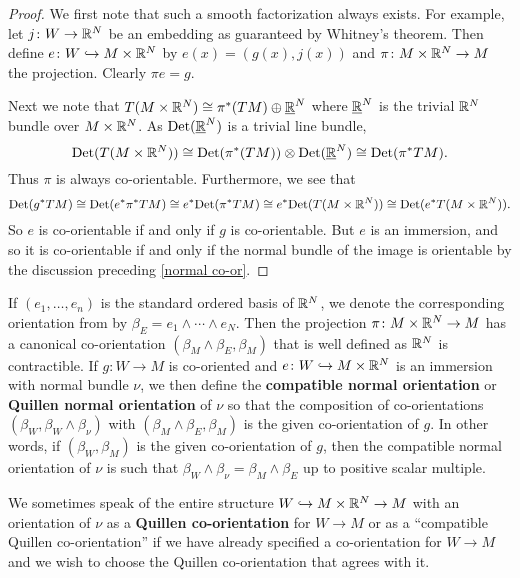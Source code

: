 \begin{proof}
	We first note that such a smooth factorization always exists.
	For example, let $j \colon W \to \mathbb{R}^N$ be an embedding as guaranteed by Whitney's theorem.
	Then define $e \colon W \hookrightarrow M \times \mathbb{R}^N$ by $e(x) = (g(x),j(x))$ and $\pi \colon M \times \mathbb{R}^N \to M$ the projection.
	Clearly $\pi e = g$.

	Next we note that $T(M \times \mathbb{R}^N) \cong \pi^*(TM) \oplus \underline{\mathbb{R}}^N$ where $\underline{\mathbb{R}}^N$ is the trivial $\mathbb{R}^N$ bundle over $M \times \mathbb{R}^N$.
	As ${\rm Det}( \underline{\mathbb{R}}^N)$ is a trivial line bundle,
	\begin{equation*}
		{\rm Det}(T(M \times \mathbb{R}^N)) \cong {\rm Det}(\pi^*(TM)) \otimes {\rm Det}(\underline{\mathbb{R}}^N) \cong {\rm Det}(\pi^*TM).
	\end{equation*}
	Thus $\pi$ is always co-orientable.
	Furthermore, we see that
	\begin{equation*}
		{\rm Det}(g^*TM) \cong {\rm Det}(e^*\pi^*TM) \cong e^*{\rm Det}(\pi^*TM) \cong e^*{\rm Det}(T(M \times \mathbb{R}^N)) \cong {\rm Det}(e^*T(M \times \mathbb{R}^N)).
	\end{equation*}
	So $e$ is co-orientable if and only if $g$ is co-orientable.
	But $e$ is an immersion, and so it is co-orientable if and only if the normal bundle of the image is orientable by the discussion preceding \cref{normal co-or}.
\end{proof}

\begin{definition}\label{D: Quillen normal or}
	If $(e_1, \ldots, e_n)$ is the standard ordered basis of $\mathbb{R}^N$, we denote the corresponding orientation from by $\beta_E = e_1 \wedge \cdots \wedge e_N$. 
	Then the projection $\pi \colon M \times \mathbb{R}^N \to M$ has a canonical co-orientation $(\beta_M \wedge \beta_E, \beta_M)$ that is well defined as $\mathbb{R}^N$ is contractible.
	If $g \colon W \to M$ is co-oriented and $e \colon W \hookrightarrow M \times \mathbb{R}^N$ is an immersion with normal bundle $\nu$, we then define the \textbf{compatible normal orientation} or \textbf{Quillen normal orientation} of $\nu$ so that the composition of co-orientations $(\beta_W,\beta_W \wedge \beta_\nu)$ with $(\beta_M \wedge \beta_E,\beta_M)$ is the given co-orientation of $g$.
	In other words, if $(\beta_W,\beta_M)$ is the given co-orientation of $g$, then the compatible normal orientation of $\nu$ is such that $\beta_W \wedge \beta_\nu = \beta_M \wedge \beta_E$ up to positive scalar multiple.

	We sometimes speak of the entire structure $W \hookrightarrow M \times \mathbb{R}^N \to M$ with an orientation of $\nu$ as a \textbf{Quillen co-orientation} for $W \to M$ or as a ``compatible Quillen co-orientation'' if we have already specified a co-orientation for $W \to M$ and we wish to choose the Quillen co-orientation that agrees with it.
\end{definition}

